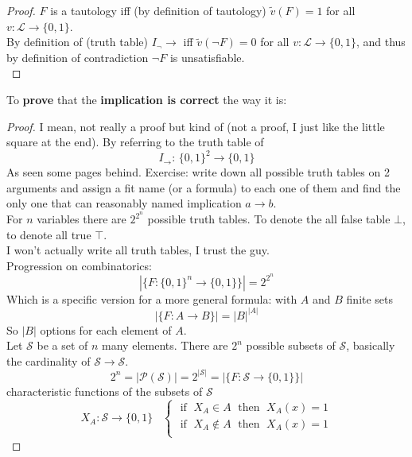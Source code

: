 \documentclass[11pt]{article}
\begin{document}
	\begin{proof}
		$F$ is a tautology iff (by definition of tautology) $\tilde{v} (F) = 1$ for all $v: \mathcal{L} \rightarrow \{0,1\}$.\\
		
		By definition of (truth table) $I_\neg \rightarrow$ iff $\tilde{v} (\neg F) = 0$ for all $v: \mathcal{L} \rightarrow \{0,1\}$, and thus by definition of contradiction $\neg F$ is unsatisfiable.\\
	\end{proof}
	
	\newpage
	
	To \textbf{prove} that the \textbf{implication is correct} the way it is:
	\begin{proof}
		I mean, not really a proof but kind of (not a proof, I just like the little square at the end). By referring to the truth table of 
		$$ I_\rightarrow : \, \{0,1\}^2 \rightarrow \{0,1\} $$
		As seen some pages behind. Exercise: write down all possible truth tables on 2 arguments and assign a fit name (or a formula) to each one of them and find the only one that can reasonably named implication $a \rightarrow b$.\\
		
		For $n$ variables there are $2^{2^n}$ possible truth tables.  To denote the all false table $\bot$, to denote all true $\top$.\\
		
		I won't actually write all truth tables, I trust the guy.\\
		
		Progression on combinatorics: 
		$$ |\{F : \{0,1\}^n \rightarrow \{0,1\} \}| = 2^{2^n} $$
		Which is a specific version for a more general formula: with $A$ and $B$ finite sets
		$$ |\{F : A \rightarrow B \}| = |B|^{|A|} $$
		So $|B|$ options for each element of $A$.\\
		
		Let $\mathcal{S}$ be a set of $n$ many elements. There are $2^n$ possible subsets of $\mathcal{S}$, basically the cardinality of $\mathcal{S} \rightarrow \mathcal{S}$.\\
		
		$$ 2^n = |\mathcal{P} (\mathcal{S})| = 2^{|\mathcal{S}|} = |\{F : \mathcal{S} \rightarrow \{0,1\}\}|$$
		characteristic functions of the subsets of $\mathcal{S}$
		$$ X_A :  \mathcal{S} \rightarrow \{0,1\} \;\;\;
		\begin{cases}
			\text{ if } \; X_A \in A \; \text{ then } \; X_A (x) = 1 \\
			\text{ if } \; X_A \notin A \; \text{ then } \; X_A (x) = 1 \\
		\end{cases}
		$$
		

\end{proof}
\end{document}
